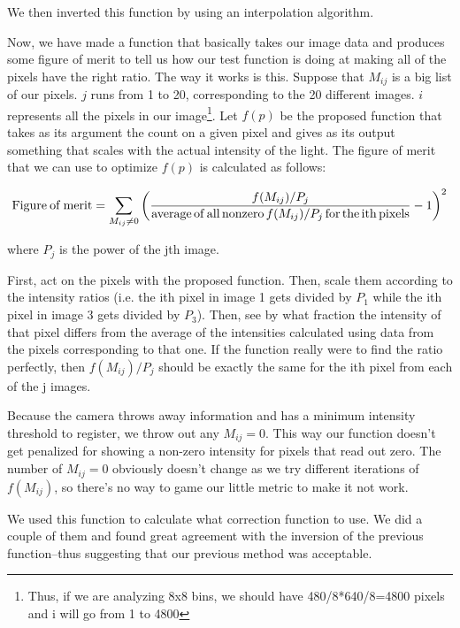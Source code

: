 We then inverted this function by using an interpolation algorithm. 

Now, we have made a function that basically takes our image data and produces some figure of merit to tell us how our test function is doing at making all of the pixels have the right ratio. The way it works is this. Suppose that $M_{i j}$ is a big list of our pixels. $j$ runs from 1 to 20, corresponding to the 20 different images. $i$ represents all the pixels in our image\footnote{Thus, if we are analyzing 8x8 bins, we should have 480/8*640/8=4800 pixels and i will go from 1 to 4800}. Let $f(p)$ be the proposed function that takes as its argument the count on a given pixel and gives as its output something that scales with the actual intensity of the light. The figure of merit that we can use to optimize $f(p)$ is calculated as follows: 

\begin{equation}
{\rm Figure\:of\:merit}=\sum_{ M_{i j}\neq 0}\left(\frac{f(M_{i j})/P_j}{{\rm average\,of\,all\,nonzero\,} f(M_{i j})/P_j {\rm \,for\,the\,ith\,pixels}}-1\right)^2
\end{equation}

where $P_j$ is the power of the jth image.

First, act on the pixels with the proposed function. Then, scale them according to the intensity ratios (i.e. the ith pixel in image 1 gets divided by $P_1$ while the ith pixel in image 3 gets divided by $P_3$). Then, see by what fraction the intensity of that pixel differs from the average of the intensities calculated using data from the pixels corresponding to that one. If the function really were to find the ratio perfectly, then $f(M_{ij})/P_j$ should be exactly the same for the ith pixel from each of the j images. 

Because the camera throws away information and has a minimum intensity threshold to register, we throw out any $M_{i j}=0$. This way our function doesn't get penalized for showing a non-zero intensity for pixels that read out zero. The number of $M_{i j}=0$ obviously doesn't change as we try different iterations of $f(M_{ij})$, so there's no way to game our little metric to make it not work.

We used this function to calculate what correction function to use. We did a couple of them and found great agreement with the inversion of the previous function--thus suggesting that our previous method was acceptable. 
 

%